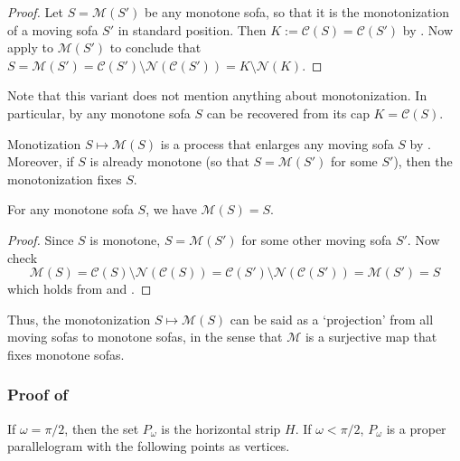 \begin{proof}
Let \(S = \mathcal{M}(S')\) be any monotone sofa, so that it is the monotonization of a moving sofa \(S'\) in standard position. Then \(K := \mathcal{C}(S) = \mathcal{C}(S')\) by . Now apply  to \(\mathcal{M}(S')\) to conclude that \(S = \mathcal{M}(S') = \mathcal{C}(S') \setminus \mathcal{N}(\mathcal{C}(S')) = K \setminus \mathcal{N}(K)\).
\end{proof}

Note that this variant does not mention anything about monotonization. In particular, by  any monotone sofa \(S\) can be recovered from its cap \(K = \mathcal{C}(S)\).

Monotization \(S \mapsto \mathcal{M}(S)\) is a process that enlarges any moving sofa \(S\) by . Moreover, if \(S\) is already monotone (so that \(S = \mathcal{M}(S')\) for some \(S'\)), then the monotonization fixes \(S\).

\begin{theorem}

For any monotone sofa \(S\), we have \(\mathcal{M}(S) = S\).

\label{thm:monotonization-fixpoint}
\end{theorem}

\begin{proof}
Since \(S\) is monotone, \(S = \mathcal{M}(S')\) for some other moving sofa \(S'\). Now check
\[
\mathcal{M}(S) = \mathcal{C}(S) \setminus \mathcal{N}(\mathcal{C}(S)) = \mathcal{C}(S') \setminus \mathcal{N}(\mathcal{C}(S')) = \mathcal{M}(S') = S
\]
which holds from  and .
\end{proof}

Thus, the monotonization \(S \mapsto \mathcal{M}(S)\) can be said as a ‘projection’ from all moving sofas to monotone sofas, in the sense that \(\mathcal{M}\) is a surjective map that fixes monotone sofas.

\subsubsection{\texorpdfstring{Proof of }{Proof of }}

If \(\omega = \pi / 2\), then the set \(P_\omega\) is the horizontal strip \(H\). If \(\omega < \pi/2\), \(P_\omega\) is a proper parallelogram with the following points as vertices.

